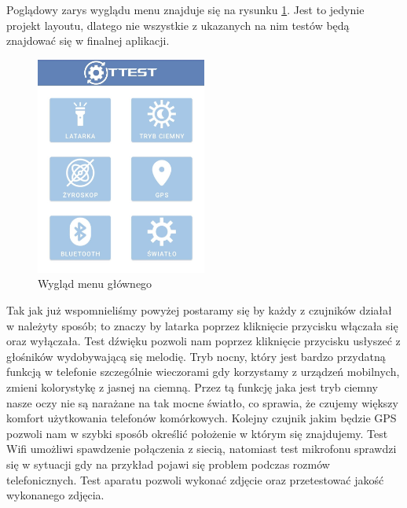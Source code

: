 \newpage

Poglądowy zarys wyglądu menu znajduje się na rysunku \ref{rys:menu_punkt2}. Jest to jedynie projekt layoutu, dlatego nie wszystkie z ukazanych na nim testów będą znajdować się w finalnej aplikacji. \newline

\begin{figure}[!hbt]
	\begin{center}
		\includegraphics[angle=360, width=0.50\textwidth]{rys/punkt2/menu.jpg}
		\caption{Wygląd menu głównego}
		\label{rys:menu_punkt2}
	\end{center}
\end{figure}

Tak jak już wspomnieliśmy powyżej postaramy się by każdy z czujników działał w należyty sposób; to znaczy by latarka poprzez kliknięcie przycisku włączała się oraz wyłączała. Test dźwięku pozwoli nam poprzez kliknięcie przycisku usłyszeć z głośników wydobywającą się melodię. Tryb nocny, który jest bardzo przydatną funkcją w telefonie szczególnie wieczorami gdy korzystamy z urządzeń mobilnych, zmieni kolorystykę z jasnej na ciemną. Przez tą funkcję jaka jest tryb ciemny nasze oczy nie są narażane na tak mocne światło, co sprawia, że czujemy większy komfort użytkowania telefonów komórkowych. Kolejny czujnik jakim będzie GPS pozwoli nam w szybki sposób określić położenie w którym się znajdujemy. Test Wifi umożliwi spawdzenie połączenia z siecią, natomiast test mikrofonu sprawdzi się w sytuacji gdy na przykład pojawi się problem podczas rozmów telefonicznych. Test aparatu pozwoli wykonać zdjęcie oraz przetestować jakość wykonanego zdjęcia. \newline

\newpage

